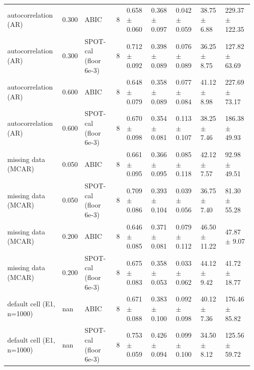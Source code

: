 \begin{table}[t]
\begin{tabular}{@{}lllllllll@{}}
autocorrelation (AR) & 0.300 & ABIC & 8 & 0.658 $\pm$ 0.060 & 0.368 $\pm$ 0.097 & 0.042 $\pm$ 0.059 & 38.75 $\pm$ 6.88 & 229.37 $\pm$ 122.35\\
autocorrelation (AR) & 0.300 & SPOT-cal (floor 6e-3) & 8 & 0.712 $\pm$ 0.092 & 0.398 $\pm$ 0.089 & 0.076 $\pm$ 0.089 & 36.25 $\pm$ 8.75 & 127.82 $\pm$ 63.69\\
autocorrelation (AR) & 0.600 & ABIC & 8 & 0.648 $\pm$ 0.079 & 0.358 $\pm$ 0.089 & 0.077 $\pm$ 0.084 & 41.12 $\pm$ 8.98 & 227.69 $\pm$ 73.17\\
autocorrelation (AR) & 0.600 & SPOT-cal (floor 6e-3) & 8 & 0.670 $\pm$ 0.098 & 0.354 $\pm$ 0.081 & 0.113 $\pm$ 0.107 & 38.25 $\pm$ 7.46 & 186.38 $\pm$ 49.93\\
missing data (MCAR) & 0.050 & ABIC & 8 & 0.661 $\pm$ 0.095 & 0.366 $\pm$ 0.095 & 0.085 $\pm$ 0.118 & 42.12 $\pm$ 7.57 & 92.98 $\pm$ 49.51\\
missing data (MCAR) & 0.050 & SPOT-cal (floor 6e-3) & 8 & 0.709 $\pm$ 0.086 & 0.393 $\pm$ 0.104 & 0.039 $\pm$ 0.056 & 36.75 $\pm$ 7.40 & 81.30 $\pm$ 55.28\\
missing data (MCAR) & 0.200 & ABIC & 8 & 0.646 $\pm$ 0.085 & 0.371 $\pm$ 0.081 & 0.079 $\pm$ 0.112 & 46.50 $\pm$ 11.22 & 47.87 $\pm$ 9.07\\
missing data (MCAR) & 0.200 & SPOT-cal (floor 6e-3) & 8 & 0.675 $\pm$ 0.083 & 0.358 $\pm$ 0.053 & 0.033 $\pm$ 0.062 & 44.12 $\pm$ 9.42 & 41.72 $\pm$ 18.77\\
default cell (E1, n=1000) & nan & ABIC & 8 & 0.671 $\pm$ 0.088 & 0.383 $\pm$ 0.100 & 0.092 $\pm$ 0.098 & 40.12 $\pm$ 7.36 & 176.46 $\pm$ 85.82\\
default cell (E1, n=1000) & nan & SPOT-cal (floor 6e-3) & 8 & 0.753 $\pm$ 0.059 & 0.426 $\pm$ 0.094 & 0.099 $\pm$ 0.100 & 34.50 $\pm$ 8.12 & 125.56 $\pm$ 59.72\\
\bottomrule
\end{tabular}
\end{table}
